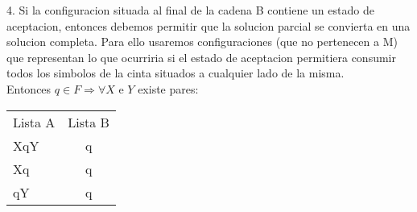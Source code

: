 \documentclass[12pt]{report}
\begin{document}
4. Si la configuracion situada al final de la cadena B contiene un estado de aceptacion, entonces debemos permitir que la solucion parcial se convierta en una solucion completa. Para ello usaremos configuraciones (que no pertenecen a M) que representan lo que ocurriria si el estado de aceptacion permitiera consumir todos los simbolos de la cinta situados a cualquier lado de la misma.\\
Entonces $q \in F \Rightarrow \forall X$ e $Y$ existe pares:
\begin{center}
 \begin{tabular}{ l c}
 	Lista A & Lista B\\
 	XqY & q\\
 	Xq & q\\
 	qY & q\\
 \end{tabular}
\end{center}
\end{document}

